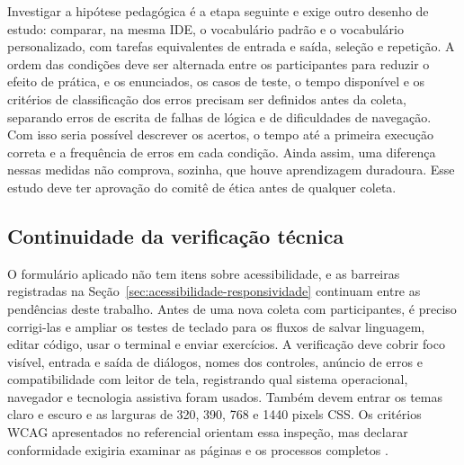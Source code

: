 Investigar a hipótese pedagógica é a etapa seguinte e exige outro desenho de estudo: comparar, na mesma IDE, o vocabulário padrão e o vocabulário personalizado, com tarefas equivalentes de entrada e saída, seleção e repetição. A ordem das condições deve ser alternada entre os participantes para reduzir o efeito de prática, e os enunciados, os casos de teste, o tempo disponível e os critérios de classificação dos erros precisam ser definidos antes da coleta, separando erros de escrita de falhas de lógica e de dificuldades de navegação. Com isso seria possível descrever os acertos, o tempo até a primeira execução correta e a frequência de erros em cada condição. Ainda assim, uma diferença nessas medidas não comprova, sozinha, que houve aprendizagem duradoura. Esse estudo deve ter aprovação do comitê de ética antes de qualquer coleta.

\subsection{Continuidade da verificação técnica}

O formulário aplicado não tem itens sobre acessibilidade, e as barreiras registradas na Seção~\ref{sec:acessibilidade-responsividade} continuam entre as pendências deste trabalho. Antes de uma nova coleta com participantes, é preciso corrigi-las e ampliar os testes de teclado para os fluxos de salvar linguagem, editar código, usar o terminal e enviar exercícios. A verificação deve cobrir foco visível, entrada e saída de diálogos, nomes dos controles, anúncio de erros e compatibilidade com leitor de tela, registrando qual sistema operacional, navegador e tecnologia assistiva foram usados. Também devem entrar os temas claro e escuro e as larguras de 320, 390, 768 e 1440 pixels CSS. Os critérios WCAG apresentados no referencial orientam essa inspeção, mas declarar conformidade exigiria examinar as páginas e os processos completos \cite{w3cwcag22,w3capg2026}.
